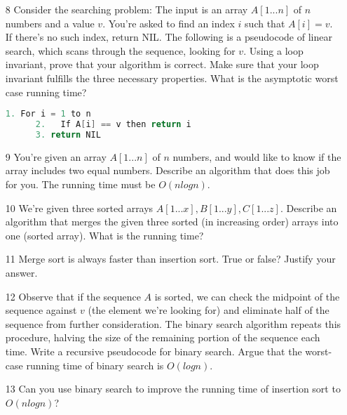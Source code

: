 \documentclass[a4paper]{article}
\begin{document}
\begin{itemize}
    \item[8] Consider the searching problem: The input is an array $A[1...n]$ of $n$ numbers and a value $v$. You're asked to find an index $i$ such that $A[i] = v$. If there's no such index, return NIL. The following is a pseudocode of linear search, which scans through the sequence, looking for $v$. Using a loop invariant, prove that your algorithm is correct. Make sure that your loop invariant fulfills the three necessary properties. What is the asymptotic worst case running time?
    \begin{lstlisting}[language=c++]
      1. For i = 1 to n
      2.   If A[i] == v then return i
      3. return NIL
    \end{lstlisting}
    \item[9] You're given an array $A[1...n]$ of $n$ numbers, and would like to know if the array includes two equal numbers. Describe an algorithm that does this job for you. The running time must be $O(nlogn)$.
    \item[10] We're given three sorted arrays $A[1...x], B[1...y], C[1...z]$. Describe an algorithm that merges the given three sorted (in increasing order) arrays into one (sorted array). What is the running time?
    \item[11] Merge sort is always faster than insertion sort. True or false? Justify your answer.
    \item[12] Observe that if the sequence $A$ is sorted, we can check the midpoint of the sequence against $v$ (the element we're looking for) and eliminate half of the sequence from further consideration. The binary search algorithm repeats this procedure, halving the size of the remaining portion of the sequence each time. Write a recursive pseudocode for binary search. Argue that the worst-case running time of binary search is $O(logn)$.
    \item[13] Can you use binary search to improve the running time of insertion sort to $O(nlogn)$?
  \end{itemize}

 

  
  
\end{document}

